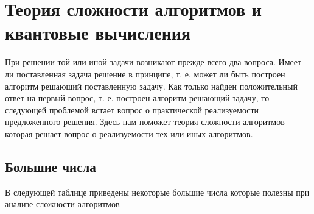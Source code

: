 \section{Теория сложности алгоритмов и квантовые вычисления}

При решении той или иной задачи возникают прежде всего два
вопроса. Имеет ли поставленная задача решение в принципе, т. е. может ли быть
построен алгоритм решающий поставленную задачу. Как только найден
положительный ответ на первый вопрос, т. е. построен алгоритм решающий
задачу, то следующей проблемой встает вопрос о практической
реализуемости предложенного решения. Здесь нам поможет теория
сложности алгоритмов которая решает вопрос о реализуемости тех или
иных алгоритмов. 

\subsection{Большие числа}
В следующей таблице \cite{bSchneier} 
приведены некоторые большие числа
которые полезны при анализе сложности алгоритмов
